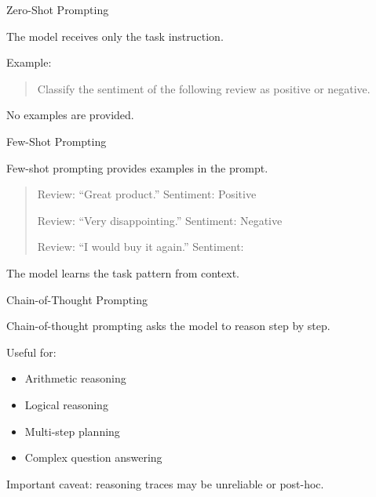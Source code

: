 \documentclass[aspectratio=169]{beamer}
\begin{document}
\begin{frame}{Zero-Shot Prompting}

The model receives only the task instruction.

\vspace{0.4cm}

Example:

\begin{quote}
Classify the sentiment of the following review as positive or negative.
\end{quote}

\vspace{0.4cm}

No examples are provided.

\end{frame}

\begin{frame}{Few-Shot Prompting}

Few-shot prompting provides examples in the prompt.

\vspace{0.4cm}

\begin{quote}
Review: ``Great product.'' Sentiment: Positive

Review: ``Very disappointing.'' Sentiment: Negative

Review: ``I would buy it again.'' Sentiment:
\end{quote}

\vspace{0.4cm}

The model learns the task pattern from context.

\end{frame}

\begin{frame}{Chain-of-Thought Prompting}

Chain-of-thought prompting asks the model to reason step by step.

\vspace{0.4cm}

Useful for:

\begin{itemize}
    \item Arithmetic reasoning
    \item Logical reasoning
    \item Multi-step planning
    \item Complex question answering
\end{itemize}

\vspace{0.4cm}

Important caveat: reasoning traces may be unreliable or post-hoc.

\end{frame}
\end{document}
